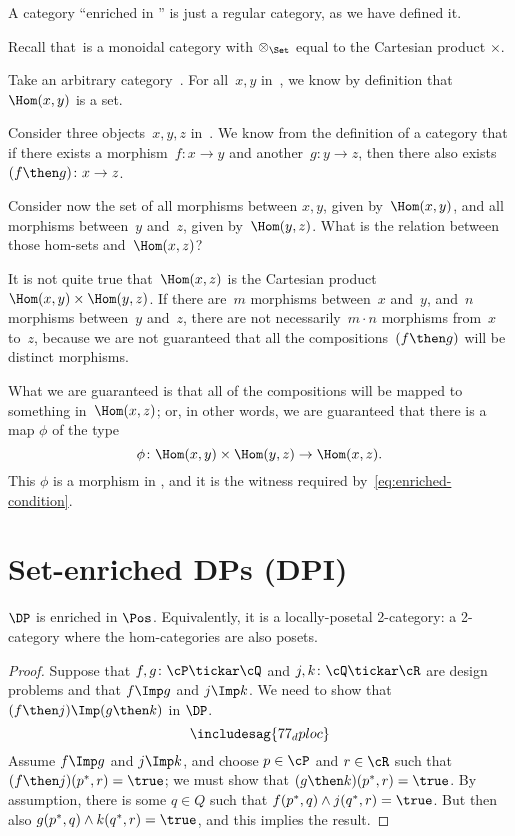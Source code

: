 
\begin{example}
A category ``enriched in \Set'' is just a regular category, as we have defined it.

Recall that~\Set is a monoidal category with $\otimes_{\Set}$ equal to the Cartesian product $\times$.

Take an arbitrary category~\CatC. For all~$x, y$ in~\CatC, we know by definition
that~$\Hom(x,y)$ is a set.

Consider three objects~$x,y,z$ in~\CatC. We know from the definition of a
category that if there exists a morphism~$f: x \to y$ and another~$g: y \to z$,
then there also exists~$(f\then g)\colon x \to z$.

Consider now the set of all morphisms between $x, y$, given by~$\Hom(x,y)$, and
all morphisms between~$y$ and~$z$, given by~$\Hom(y, z)$. What is the relation
between those hom-sets and~$\Hom(x, z)$?

It is not quite true that~$\Hom(x, z)$ is the Cartesian product~$\Hom(x, y)
\times \Hom(y, z)$. If there are~$m$ morphisms between~$x$ and~$y$, and~$n$
morphisms between~$y$ and~$z$, there are not necessarily~$m \cdot n$ morphisms
from~$x$ to~$z$, because we are not guaranteed that all the compositions~$(f\then g)$
will be distinct morphisms.

What we are guaranteed is that all of the compositions will be mapped to something in~$\Hom(x, z)$; or, in other words, we are guaranteed that there
is a map $\phi$ of the type
\begin{equation}
    \phi \colon \Hom(x, y) \times \Hom(y, z) \rightarrow \Hom(x, z).
\end{equation}
This $\phi$ is a morphism in \Set, and it is the witness required by~\eqref{eq:enriched-condition}.

\end{example}



\section{Set-enriched DPs (DPI)}

\begin{proposition}\label{prop:DP_loc_pos}
$\DP$ is enriched in $\Pos$. Equivalently, it is a locally-posetal 2-category: a 2-category where the hom-categories are also posets.
\end{proposition}
\begin{proof}
Suppose that $f,g\colon\cP \tickar\cQ $ and $j,k\colon\cQ \tickar\cR $ are design problems and that $f\Imp g$ and $j\Imp k$. We need to show that $(f\then j)\Imp(g\then k)$ in $\DP$.
\begin{equation}
\includesag{77_dploc}
\end{equation}
Assume $f\Imp g$ and $j\Imp k$, and choose $p\in\cP $ and $r\in\cR $ such that $(f\then j)(p^*,r)=\true$; we must show that $(g\then k)(p^*,r)=\true$. By assumption, there is some $q\in Q$ such that $f(p^*,q)\wedge j(q^*,r)=\true$. But then also $g(p^*,q)\wedge k(q^*,r)=\true$, and this implies the result.
\end{proof}

